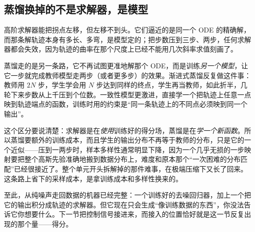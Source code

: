 \subsection{蒸馏换掉的不是求解器，是模型}

高阶求解器能把拐点左移，但左移不到头。它们逼近的是同一个 ODE 的精确解，而那条解轨迹本身有多长、多弯，是模型定的；把步数压到三步、两步，任何求解器都会失效，因为轨迹的曲率在那个尺度上已经不能用几次斜率求值刻画了。

蒸馏走的是另一条路，它不再试图更准地解那个 ODE，而是训练\emph{另一个模型}，让它一步就完成教师模型走两步（或者更多步）的效果。渐进式蒸馏反复做这件事：教师用 \(2N\) 步，学生学会用 \(N\) 步达到同样的终点，学生再当教师，如此折半，几轮下来步数从上千压到个位数。一致性模型更激进，直接学一个把轨迹上任意一点映到轨迹端点的函数，训练时用的约束是``同一条轨迹上的不同点必须映到同一个输出''。

这个区分要说清楚：求解器是在\emph{使用}训练好的得分场，蒸馏是在\emph{学一个新函数}。所以蒸馏要额外的训练成本，而且学生的输出分布不再等于教师的分布，只是它的一个近似——压到一两步时，样本多样性通常明显下降，因为一个几乎无损的一步映射要把整个高斯先验准确地搬到数据分布上，难度和原本那个``一次困难的分布匹配''已经很接近了。整个单元开头拆解掉的那件难事，在极端压缩下又长了回来。这条路上省下的采样成本，是拿训练成本和多样性换来的。

至此，从纯噪声走回数据的机器已经完整：一个训练好的去噪回归器，加上一个把它的输出积分成轨迹的求解器。但它现在只会生成``像训练数据的东西''，你没法告诉它你想要什么。下一节把控制信号接进来，而接入的位置恰好就是这一节反复出现的那个量——得分。
